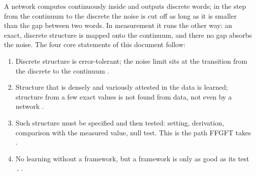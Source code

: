 \begin{center}
\end{center}

\noindent A network computes continuously inside and outputs discrete words; in the step from the
continuum to the discrete the noise is cut off as long as it is smaller than the gap between two
words. In measurement it runs the other way: an exact, discrete structure is mapped onto the
continuum, and there no gap absorbs the noise. The four core statements of this document follow:

\begin{enumerate}
\item Discrete structure is error-tolerant; the noise limit sits at the transition from the discrete
  to the continuum \BM.
\item Structure that is densely and variously attested in the data is learned; structure from a few
  exact values is not found from data, not even by a network \KM.
\item Such structure must be specified and then tested: setting, derivation, comparison with the
  measured value, null test. This is the path FFGFT takes \SM.
\item No learning without a framework, but a framework is only as good as its test \QM\,\cite{Wolpert1996}, \KM.
\end{enumerate}

